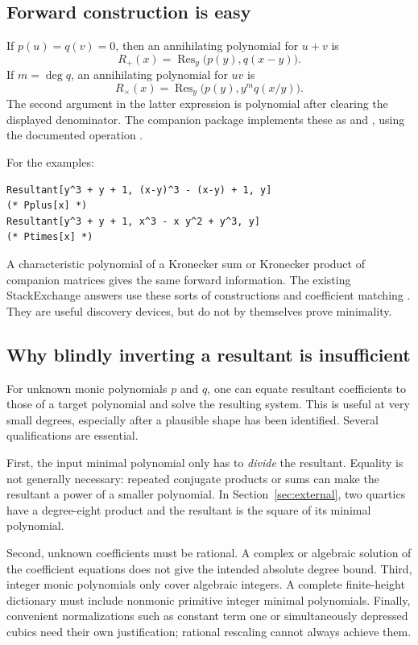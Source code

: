 \documentclass[11pt,a4paper]{article}
\theoremstyle{definition}\newtheorem{definition}[theorem]{Definition}
\theoremstyle{remark}\newtheorem{remark}[theorem]{Remark}
\newcommand{\code}[1]{\texttt{\detokenize{#1}}}
\begin{document}
\subsection{Forward construction is easy}

If $p(u)=q(v)=0$, then an annihilating polynomial for $u+v$ is
\[
 R_+(x)=\operatorname{Res}_y\bigl(p(y),q(x-y)\bigr).
\]
If $m=\deg q$, an annihilating polynomial for $uv$ is
\[
 R_\times(x)=\operatorname{Res}_y\bigl(p(y),y^m q(x/y)\bigr).
\]
The second argument in the latter expression is polynomial after clearing
the displayed denominator. The companion package implements these as
\code{SumPolynomial} and \code{ProductPolynomial}, using the documented
\code{Resultant} operation \cite{resultant}.

For the examples:
\begin{lstlisting}
Resultant[y^3 + y + 1, (x-y)^3 - (x-y) + 1, y]
(* Pplus[x] *)
Resultant[y^3 + y + 1, x^3 - x y^2 + y^3, y]
(* Ptimes[x] *)
\end{lstlisting}
A characteristic polynomial of a Kronecker sum or Kronecker product of
companion matrices gives the same forward information. The existing
StackExchange answers use these sorts of constructions and coefficient
matching \cite{question}. They are useful discovery devices, but do not by
themselves prove minimality.

\subsection{Why blindly inverting a resultant is insufficient}

For unknown monic polynomials $p$ and $q$, one can equate resultant
coefficients to those of a target polynomial and solve the resulting system.
This is useful at very small degrees, especially after a plausible shape has
been identified. Several qualifications are essential.

First, the input minimal polynomial only has to \emph{divide} the
resultant. Equality is not generally necessary: repeated conjugate products
or sums can make the resultant a power of a smaller polynomial. In
Section~\ref{sec:external}, two quartics have a degree-eight product and the
resultant is the square of its minimal polynomial.

Second, unknown coefficients must be rational. A complex or algebraic
solution of the coefficient equations does not give the intended absolute
degree bound. Third, integer monic polynomials only cover algebraic
integers. A complete finite-height dictionary must include nonmonic
primitive integer minimal polynomials. Finally, convenient normalizations
such as constant term one or simultaneously depressed cubics need their own
justification; rational rescaling cannot always achieve them.
\end{document}

